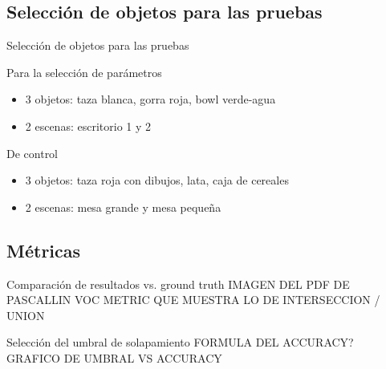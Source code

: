 \documentclass[]{beamer}
\begin{document}
\subsection{Selección de objetos para las pruebas}
\begin{frame}{Selección de objetos para las pruebas}

    \begin{block}{Para la selección de parámetros}
        \begin{itemize}
            \item 3 objetos: taza blanca, gorra roja, bowl verde-agua
            \item 2 escenas: escritorio 1 y 2
        \end{itemize}
    \end{block}

    \begin{block}{De control}
        \begin{itemize}
            \item 3 objetos: taza roja con dibujos, lata, caja de cereales
            \item 2 escenas: mesa grande y mesa pequeña
        \end{itemize}
    \end{block}
\end{frame}

\subsection{Métricas}
\begin{frame}[t]{Comparación de resultados vs. ground truth}
    IMAGEN DEL PDF DE PASCALLIN VOC METRIC QUE MUESTRA LO DE INTERSECCION / UNION
\end{frame}


\begin{frame}[t]{Selección del umbral de solapamiento}
    FORMULA DEL ACCURACY?\\
    GRAFICO DE UMBRAL VS ACCURACY\\
\end{frame}
\end{document}
